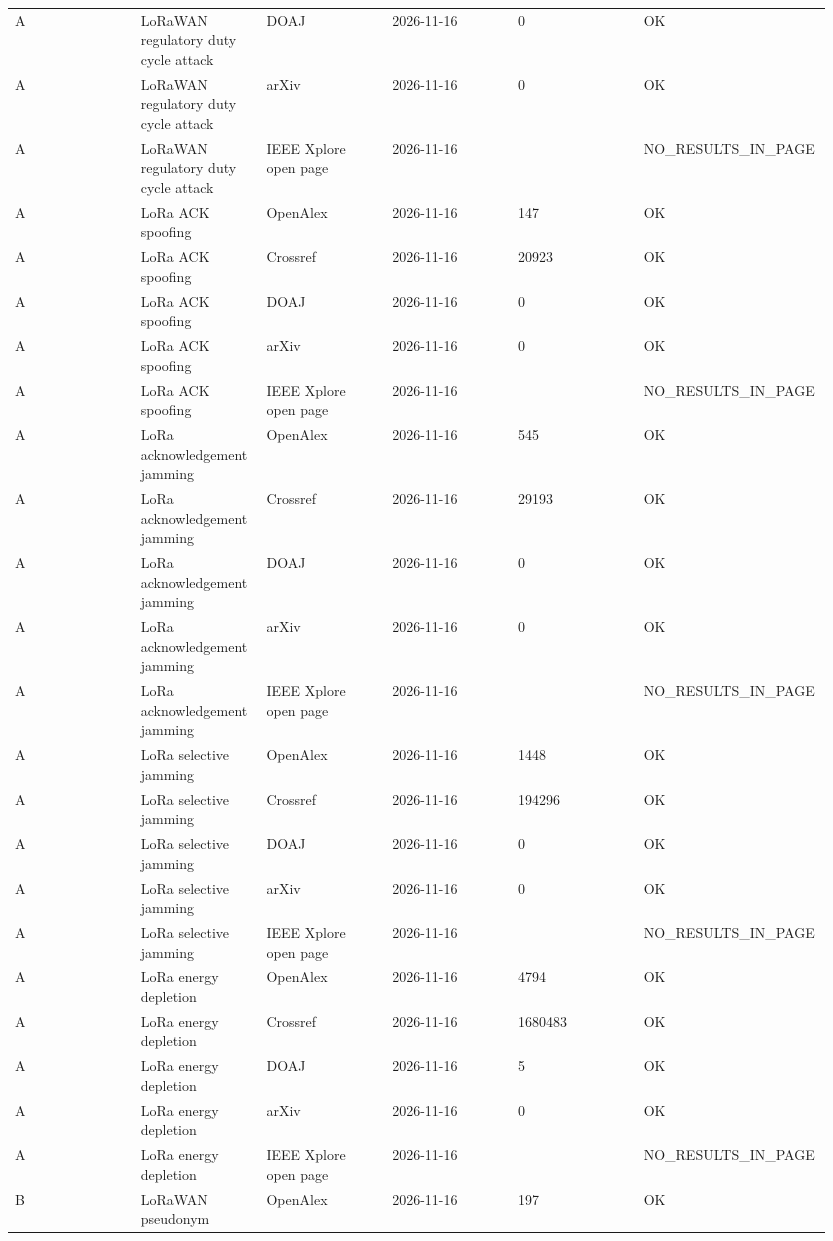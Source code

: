 {\begin{longtable}{p{0.158\linewidth}p{0.158\linewidth}p{0.158\linewidth}p{0.158\linewidth}p{0.158\linewidth}p{0.158\linewidth}}
A & LoRaWAN regulatory duty cycle attack & DOAJ & 2026-11-16 & 0 & OK \\
A & LoRaWAN regulatory duty cycle attack & arXiv & 2026-11-16 & 0 & OK \\
A & LoRaWAN regulatory duty cycle attack & IEEE Xplore open page & 2026-11-16 &  & NO\_RESULTS\_IN\_PAGE \\
A & LoRa ACK spoofing & OpenAlex & 2026-11-16 & 147 & OK \\
A & LoRa ACK spoofing & Crossref & 2026-11-16 & 20923 & OK \\
A & LoRa ACK spoofing & DOAJ & 2026-11-16 & 0 & OK \\
A & LoRa ACK spoofing & arXiv & 2026-11-16 & 0 & OK \\
A & LoRa ACK spoofing & IEEE Xplore open page & 2026-11-16 &  & NO\_RESULTS\_IN\_PAGE \\
A & LoRa acknowledgement jamming & OpenAlex & 2026-11-16 & 545 & OK \\
A & LoRa acknowledgement jamming & Crossref & 2026-11-16 & 29193 & OK \\
A & LoRa acknowledgement jamming & DOAJ & 2026-11-16 & 0 & OK \\
A & LoRa acknowledgement jamming & arXiv & 2026-11-16 & 0 & OK \\
A & LoRa acknowledgement jamming & IEEE Xplore open page & 2026-11-16 &  & NO\_RESULTS\_IN\_PAGE \\
A & LoRa selective jamming & OpenAlex & 2026-11-16 & 1448 & OK \\
A & LoRa selective jamming & Crossref & 2026-11-16 & 194296 & OK \\
A & LoRa selective jamming & DOAJ & 2026-11-16 & 0 & OK \\
A & LoRa selective jamming & arXiv & 2026-11-16 & 0 & OK \\
A & LoRa selective jamming & IEEE Xplore open page & 2026-11-16 &  & NO\_RESULTS\_IN\_PAGE \\
A & LoRa energy depletion & OpenAlex & 2026-11-16 & 4794 & OK \\
A & LoRa energy depletion & Crossref & 2026-11-16 & 1680483 & OK \\
A & LoRa energy depletion & DOAJ & 2026-11-16 & 5 & OK \\
A & LoRa energy depletion & arXiv & 2026-11-16 & 0 & OK \\
A & LoRa energy depletion & IEEE Xplore open page & 2026-11-16 &  & NO\_RESULTS\_IN\_PAGE \\
B & LoRaWAN pseudonym & OpenAlex & 2026-11-16 & 197 & OK \\

\end{longtable}}
